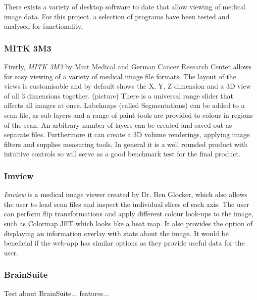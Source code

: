 \documentclass[a4paper,11pt,titlepage]{article}
\begin{document}
There exists a variety of desktop software to date that allow viewing of medical image data. For this project, a selection of programs have been tested and analysed for functionality.

\subsubsection{MITK 3M3}
Firstly, \textit{MITK 3M3} by Mint Medical and German Cancer Research Center allows for easy viewing of a variety of medical image file formats. The layout of the views is customisable and by default shows the X, Y, Z dimension and a 3D view of all 3 dimensions together. (picture) There is a universal range slider that affects all images at once. Labelmaps (called Segmentations) can be added to a scan file, as sub layers and a range of paint tools are provided to colour in regions of the scan. An arbitrary number of layers can be created and saved out as separate files. 
Furthermore it can create a 3D volume renderings, applying image filters and supplies measuring tools. In general it is a well rounded product with intuitive controls so will serve as a good benchmark test for the final product.

\subsubsection{Imview}
\textit{Imview} is a medical image viewer created by Dr. Ben Glocker, which also allows the user to load scan files and inspect the individual slices of each axis. The user can perform flip transformations and apply different colour look-ups to the image, such as Colormap JET which looks like a heat map. It also provides the option of displaying an information overlay with stats about the image. It would be beneficial if the web-app has similar options as they provide useful data for the user.

\subsubsection{BrainSuite}

Test about BrainSuite... features...
\end{document}
